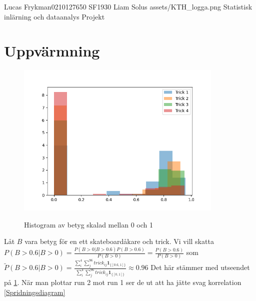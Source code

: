 \documentclass{assignment}
\newcommand{\indicator}[1]{\mathbf{1}_{\{#1\}}}
\begin{document}
\assignmentTitle
{Lucas Frykman}{0210127650}
{SF1930}
{Liam Solus}
{assets/KTH_logga.png}
{Statistisk inlärning och dataanalys}
{Projekt}


\section{Uppvärmning}

\begin{figure}[!h]
    \caption{Histogram av betyg skalad mellan 0 och 1}
    \begin{center}
        \includegraphics[width = 99mm]{assets/Figure_2.png} \label{Histogram 1}
    \end{center}
\end{figure}


Låt $B$ vara betyg för en ett skateboardåkare och trick. Vi vill skatta $P(B>0.6|B>0) = \frac{P(B>0|B>0.6)P(B>0.6)}{P(B>0)}=\frac{P(B>0.6)}{P(B>0)}$
som $\tilde{P}(B>0.6|B>0) = \frac{\sum_{i}^4\sum_{j}^{96}trick_{ij}\indicator{[0.6,1]}}{\sum_{i}^4\sum_{j}^{96}trick_{ij}\indicator{[0,1]}} \approx 0.96$
Det här stämmer med utseendet på \cref{Histogram 1}. När man plottar run 2 mot run 1 ser de ut att ha jätte svag korrelation \cref{Spridningsdiagram}
\end{document}
